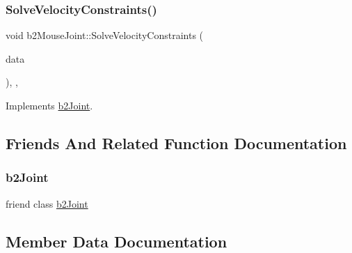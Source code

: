 \mbox{\label{classb2_mouse_joint_a9256297320a1a67e9dc49b70f4798dd8}} 
\subsubsection{\texorpdfstring{SolveVelocityConstraints()}{SolveVelocityConstraints()}}
{\footnotesize\ttfamily void b2\+Mouse\+Joint\+::\+Solve\+Velocity\+Constraints (\begin{DoxyParamCaption}\item[{const \mbox{\hyperlink{structb2_solver_data}{b2\+Solver\+Data}} \&}]{data }\end{DoxyParamCaption})\hspace{0.3cm}{\ttfamily [override]}, {\ttfamily [protected]}, {\ttfamily [virtual]}}



Implements \mbox{\hyperlink{classb2_joint_ad302c8d02efcfe934158de0dc429348d}{b2\+Joint}}.



\subsection{Friends And Related Function Documentation}
\mbox{\label{classb2_mouse_joint_a54ade8ed3d794298108d7f4c4e4793fa}} 
\subsubsection{\texorpdfstring{b2Joint}{b2Joint}}
{\footnotesize\ttfamily friend class \mbox{\hyperlink{classb2_joint}{b2\+Joint}}\hspace{0.3cm}{\ttfamily [friend]}}



\subsection{Member Data Documentation}
\mbox{\label{classb2_mouse_joint_afb358e67d625526316bc2f53a1e3cae0}} 
